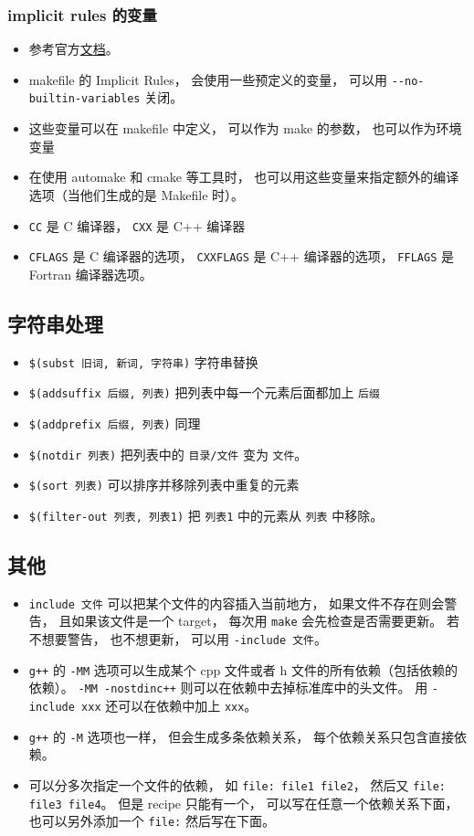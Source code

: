 \subsubsection{implicit rules 的变量}
\begin{itemize}
\item 参考官方\href{https://www.gnu.org/software/make/manual/html_node/Implicit-Variables.html}{文档}。
\item makefile 的 Implicit Rules， 会使用一些预定义的变量， 可以用 \verb|--no-builtin-variables| 关闭。
\item 这些变量可以在 makefile 中定义， 可以作为 make 的参数， 也可以作为环境变量
\item 在使用 automake 和 cmake 等工具时， 也可以用这些变量来指定额外的编译选项（当他们生成的是 Makefile 时）。
\item \verb|CC| 是 C 编译器， \verb|CXX| 是 C++ 编译器
\item \verb|CFLAGS| 是 C 编译器的选项， \verb|CXXFLAGS| 是 C++ 编译器的选项， \verb|FFLAGS| 是 Fortran 编译器选项。
\end{itemize}

\subsection{字符串处理}
\begin{itemize}
\item \verb|$(subst 旧词, 新词, 字符串)| 字符串替换
\item \verb|$(addsuffix 后缀, 列表)| 把列表中每一个元素后面都加上 \verb|后缀|
\item \verb|$(addprefix 后缀, 列表)| 同理
\item \verb|$(notdir 列表)| 把列表中的 \verb|目录/文件| 变为 \verb|文件|。
\item \verb|$(sort 列表)| 可以排序并移除列表中重复的元素
\item \verb|$(filter-out 列表, 列表1)| 把 \verb|列表1| 中的元素从 \verb|列表| 中移除。
\end{itemize}


\subsection{其他}
\begin{itemize}
\item \verb|include 文件| 可以把某个文件的内容插入当前地方， 如果文件不存在则会警告， 且如果该文件是一个 target， 每次用 \verb|make| 会先检查是否需要更新。 若不想要警告， 也不想更新， 可以用 \verb|-include 文件|。
\item \verb|g++| 的 \verb|-MM| 选项可以生成某个 cpp 文件或者 h 文件的所有依赖（包括依赖的依赖）。 \verb|-MM -nostdinc++| 则可以在依赖中去掉标准库中的头文件。 用 \verb|-include xxx| 还可以在依赖中加上 \verb|xxx|。
\item \verb|g++| 的 \verb|-M| 选项也一样， 但会生成多条依赖关系， 每个依赖关系只包含直接依赖。
\item 可以分多次指定一个文件的依赖， 如 \verb|file: file1 file2|， 然后又 \verb|file: file3 file4|。 但是 recipe 只能有一个， 可以写在任意一个依赖关系下面， 也可以另外添加一个 \verb|file:| 然后写在下面。
\end{itemize}
